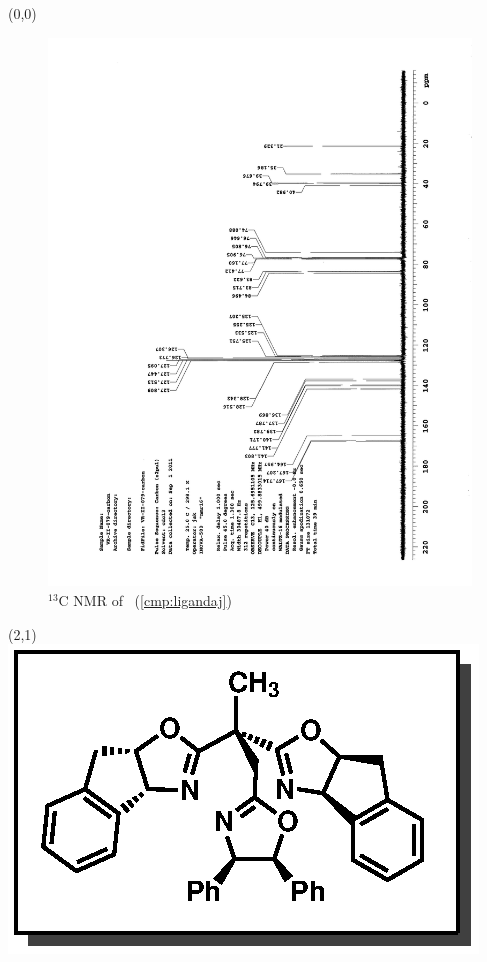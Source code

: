 \clearpage
\begin{textblock}{20}(0,0)
\begin{figure}[htb]
\caption{$^{13}$C NMR of  \CMPligandaj\ (\ref{cmp:ligandaj})}
\includegraphics[scale=0.75, trim = 0mm 0mm 0mm 5mm,
clip]{chp_asymmetric/images/nmr/ligandajC}
\vspace{-100pt}
\end{figure}
\end{textblock}
\begin{textblock}{1}(2,1)
\includegraphics[scale=0.8, angle=90]{chp_asymmetric/images/ligandaj}
\end{textblock}
\clearpage

